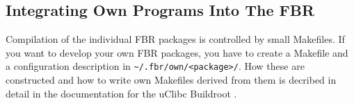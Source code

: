 \subsection{Integrating Own Programs Into The FBR}

Compilation of the individual FBR packages is controlled by small Makefiles.
If you want to develop your own FBR packages, you have to create a Makefile and
a configuration description in  \texttt{\~{}/.fbr/own/<package>/}.
How these are constructed and how to write own Makefiles derived from them
is decribed in detail in the documentation for the uClibc Buildroot
.
